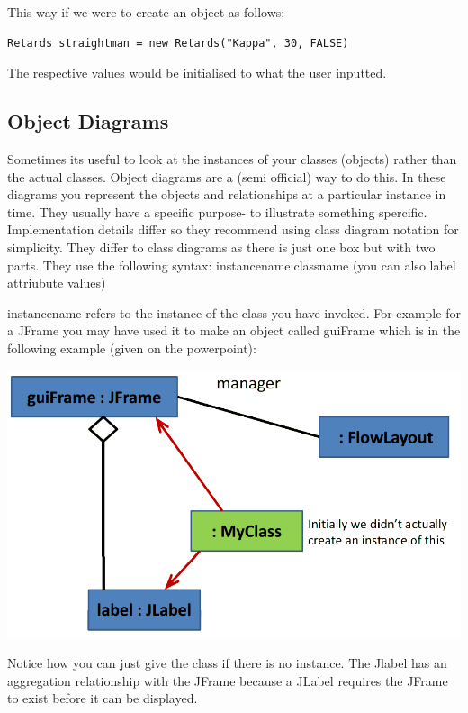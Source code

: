 \documentclass{article}
\begin{document}
This way if we were to create an object as follows:
\begin{lstlisting}
Retards straightman = new Retards("Kappa", 30, FALSE)
\end{lstlisting}

The respective values would be initialised to what the user inputted.

\subsection{Object Diagrams}

Sometimes its useful to look at the instances of your classes (objects) rather than the actual 
classes. Object diagrams are a (semi official) way to do this. In these diagrams you represent 
the objects and relationships at a particular instance in time. They usually have a specific 
purpose- to illustrate something spercific. Implementation details differ so they recommend 
using class diagram notation for simplicity. They differ to class diagrams as there is just
one box but with two parts. They use the following syntax:
\newline
instancename:classname (you can also label attriubute values)

instancename refers to the instance of the class you have invoked. For example for a JFrame
you may have used it to make an object called guiFrame which is in the following example (given
on the powerpoint):


\begin{center}
\includegraphics[scale=0.4]{objectdiagram.png}
\end{center}

Notice how you can just give the class if there is no instance. The Jlabel has an aggregation
relationship with the JFrame because a JLabel requires the JFrame to exist before it can
be displayed.
\end{document}
